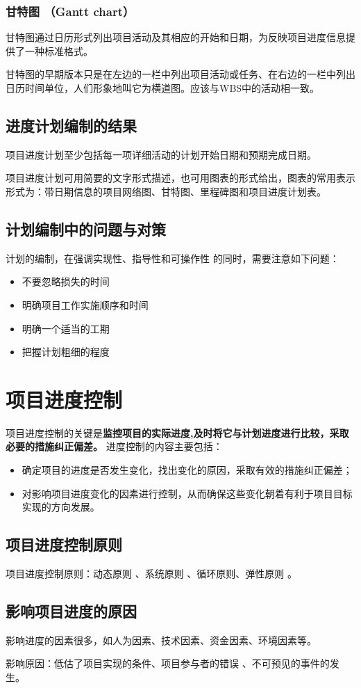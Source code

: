 \subsubsection{甘特图 （Gantt chart）}
甘特图通过日历形式列出项目活动及其相应的开始和日期，为反映项目进度信息提供了一种标准格式。
\par 甘特图的早期版本只是在左边的一栏中列出项目活动或任务、在右边的一栏中列出日历时间单位，人们形象地叫它为横道图。应该与WBS中的活动相一致。
\subsection{进度计划编制的结果}
项目进度计划至少包括每一项详细活动的计划开始日期和预期完成日期。
\par 项目进度计划可用简要的文字形式描述，也可用图表的形式给出，图表的常用表示形式为：带日期信息的项目网络图、甘特图、里程碑图和项目进度计划表。
\subsection{计划编制中的问题与对策}
计划的编制，在强调实现性、指导性和可操作性 的同时，需要注意如下问题：
\begin{itemize}
	\item 不要忽略损失的时间 
	\item 明确项目工作实施顺序和时间
	\item 明确一个适当的工期
	\item 把握计划粗细的程度
\end{itemize}
\section{项目进度控制}
项目进度控制的关键是\textbf{监控项目的实际进度,及时将它与计划进度进行比较，采取必要的措施纠正偏差。}
进度控制的内容主要包括：
\begin{itemize}
	\item 确定项目的进度是否发生变化，找出变化的原因，采取有效的措施纠正偏差；
	\item 对影响项目进度变化的因素进行控制，从而确保这些变化朝着有利于项目目标实现的方向发展。
\end{itemize}
\subsection{项目进度控制原则}
项目进度控制原则：动态原则 、系统原则 、循环原则、弹性原则 。
\subsection{影响项目进度的原因}
影响进度的因素很多，如人为因素、技术因素、资金因素、环境因素等。
\par 影响原因：低估了项目实现的条件、项目参与者的错误 、不可预见的事件的发生。
